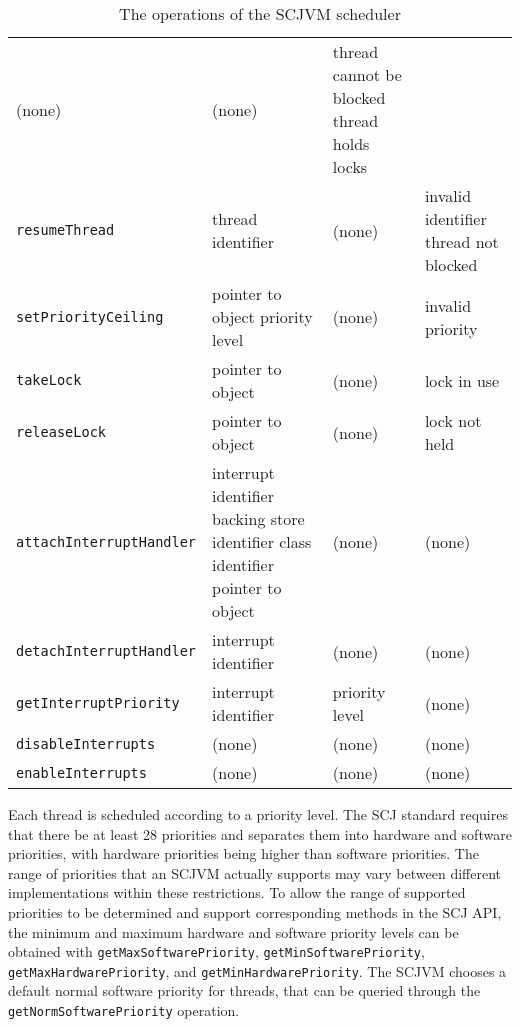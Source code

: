 \documentclass[a4paper,10pt]{report}
\begin{document}
\begin{table*}[ht]
\begin{tabular}{|l|p{3.2cm}|p{2.3cm}|p{3.6cm}|}
    (none) &
    (none) &
    thread cannot be blocked \newline
    thread holds locks
    \\\texttt{resumeThread} &
    thread identifier &
    (none) &
    invalid identifier \newline
    thread not blocked
    \\\texttt{setPriorityCeiling} &
    pointer to object \newline
    priority level &
    (none) &
    invalid priority
    \\\texttt{takeLock} &
    pointer to object &
    (none) &
    lock in use
    \\\texttt{releaseLock} &
    pointer to object &
    (none) &
    lock not held
    \\\texttt{attachInterruptHandler} &
    interrupt identifier \newline
    backing store identifier \newline
    class identifier \newline
    pointer to object &
    (none) &
    (none)
    \\\texttt{detachInterruptHandler} &
    interrupt identifier &
    (none) &
    (none)
    \\\texttt{getInterruptPriority} &
    interrupt identifier &
    priority level &
    (none)
    \\\texttt{disableInterrupts} &
    (none) &
    (none) &
    (none)
    \\\texttt{enableInterrupts} &
    (none) &
    (none) &
    (none)
  \end{tabular}
  \caption{The operations of the SCJVM scheduler}
  \label{scheduler-table}
\end{table*}

Each thread is scheduled according to a priority level.
The SCJ standard requires that there be at least 28 priorities and
separates them into hardware and software priorities, with hardware
priorities being higher than software priorities.
The range of priorities that an SCJVM actually supports may vary
between different implementations within these restrictions.
To allow the range of supported priorities to be determined and
support corresponding methods in the SCJ API, the minimum and maximum
hardware and software priority levels can be obtained with
\texttt{get\-Max\-Soft\-ware\-Pri\-or\-ity},
\texttt{get\-Min\-Soft\-ware\-Pri\-or\-ity},
\texttt{get\-Max\-Hard\-ware\-Pri\-or\-ity}, and
\texttt{get\-Min\-Hard\-ware\-Pri\-or\-ity}.
The SCJVM chooses a default normal software priority for threads, that
can be queried through the
\texttt{get\-Norm\-Soft\-ware\-Pri\-or\-ity} operation.
\end{document}
